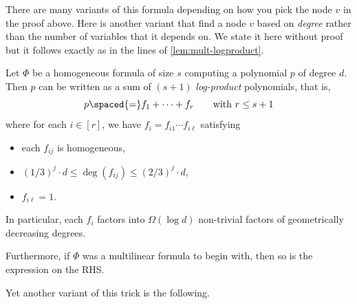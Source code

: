 There are many variants of this formula depending on how you pick the node $v$ in the proof above.
Here is another variant that find a node $v$ based on \emph{degree} rather than the number of variables that it depends on.
We state it here without proof but it follows exactly as in the lines of \autoref{lem:mult-logproduct}.

\begin{lemma}\label{lem:hom-logproduct}
  Let $\Phi$ be a homogeneous formula of size $s$ computing a polynomial $p$ of degree $d$.
Then $p$ can be written as a sum of $(s+1)$ \emph{log-product} polynomials, that is,
\[
p \spaced{=} f_1 + \cdots + f_{r}\quad\quad \text{with $r \leq s+1$}
\]
where for each $i \in [r]$, we have $f_i = f_{i1} \cdots f_{i\ell}$ satisfying
\begin{itemize}
\item each $f_{ij}$ is homogeneous,
\item $(1 / 3)^j \cdot d \leq \deg(f_{ij}) \leq (2/ 3)^j \cdot d$,
\item $f_{i\ell} = 1$.
\end{itemize}
In particular, each $f_i$ factors into $\Omega(\log d)$ non-trivial factors of geometrically decreasing degrees. 

Furthermore, if $\Phi$ was a multilinear formula to begin with, then so is the expression on the RHS. 
\end{lemma}

Yet another variant of this trick is the following.


